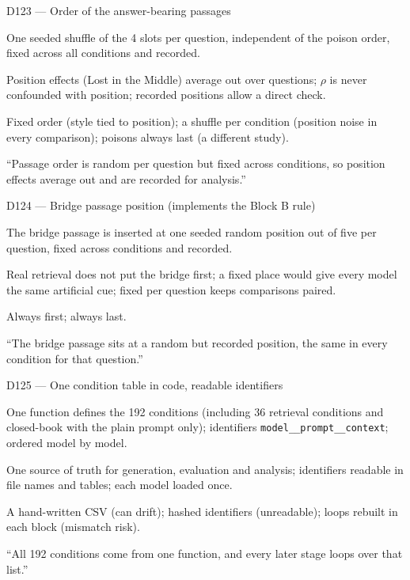 \documentclass[11pt,a4paper]{report}
\begin{document}
\begin{decisionbox}{D123 --- Order of the answer-bearing passages}
\begin{description}[nosep, leftmargin=0pt]
  \item[Decision.] One seeded shuffle of the 4 slots per question, independent of the poison order, fixed across all conditions and recorded.
  \item[Why.] Position effects (Lost in the Middle) average out over questions; $\rho$ is never confounded with position; recorded positions allow a direct check.
  \item[Alternatives.] Fixed order (style tied to position); a shuffle per condition (position noise in every comparison); poisons always last (a different study).
  \item[Interview line.] ``Passage order is random per question but fixed across conditions, so position effects average out and are recorded for analysis.''
\end{description}
\end{decisionbox}

\begin{decisionbox}{D124 --- Bridge passage position (implements the Block B rule)}
\begin{description}[nosep, leftmargin=0pt]
  \item[Decision.] The bridge passage is inserted at one seeded random position out of five per question, fixed across conditions and recorded.
  \item[Why.] Real retrieval does not put the bridge first; a fixed place would give every model the same artificial cue; fixed per question keeps comparisons paired.
  \item[Alternatives.] Always first; always last.
  \item[Interview line.] ``The bridge passage sits at a random but recorded position, the same in every condition for that question.''
\end{description}
\end{decisionbox}

\begin{decisionbox}{D125 --- One condition table in code, readable identifiers}
\begin{description}[nosep, leftmargin=0pt]
  \item[Decision.] One function defines the 192 conditions (including 36 retrieval conditions and closed-book with the plain prompt only); identifiers \texttt{model\_\_prompt\_\_context}; ordered model by model.
  \item[Why.] One source of truth for generation, evaluation and analysis; identifiers readable in file names and tables; each model loaded once.
  \item[Alternatives.] A hand-written CSV (can drift); hashed identifiers (unreadable); loops rebuilt in each block (mismatch risk).
  \item[Interview line.] ``All 192 conditions come from one function, and every later stage loops over that list.''
\end{description}
\end{decisionbox}
\end{document}
